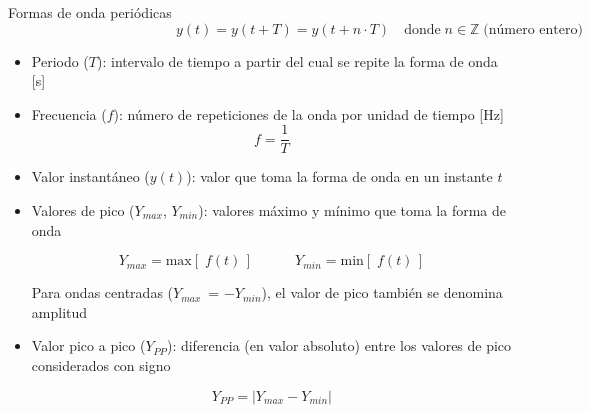 \documentclass[aspectratio=169, usenames,svgnames,dvipsnames]{beamer}
\begin{document}

\begin{frame}{Formas de onda periódicas}    
    \vspace{-4mm}
    \begin{equation*}
        \qquad \qquad \qquad \qquad \qquad \qquad   \boxed{y(t)=y(t+T)=y(t+n\cdot T)} \quad\text{donde}\;  n\in\mathbb{Z} \;\text{(número entero)}
    \end{equation*}

    \begin{itemize}
		\item \alert{Periodo ($T$)}: intervalo de tiempo a partir del cual se repite la forma de onda [s]

        \vspace{2mm}
		\item \alert{Frecuencia ($f$)}: número de repeticiones de la onda por unidad de tiempo [Hz]
		\begin{equation*}
			f = \dfrac{1}{T}
		\end{equation*}

		\item \alert{Valor instantáneo ($y(t)$)}: valor que toma la forma de onda en un instante $t$ 

        \vspace{3mm}
		\item \alert{Valores de pico ($Y_{max}$, $Y_{min}$)}: valores máximo y mínimo que toma la forma de onda

        \vspace{-2mm}
		\begin{equation*}
			Y_{max} = \text{max}[\;f(t)\,] \qquad\quad Y_{min} = \text{min}[\;f(t)\,]
		\end{equation*}
  
        \vspace{2mm}
        Para ondas centradas ($Y_{max} \,$ = $-Y_{min}$), el valor de pico también se denomina \alert{amplitud}

        \vspace{3mm}
		\item \alert{Valor pico a pico ($Y_{PP}$)}: diferencia (en valor absoluto) entre los valores de pico considerados con signo 
  
        \vspace{-6mm}
		\begin{equation*}
			Y_{PP}=|Y_{max} - Y_{min}|
		\end{equation*}
    \end{itemize}
\end{frame}
\end{document}
